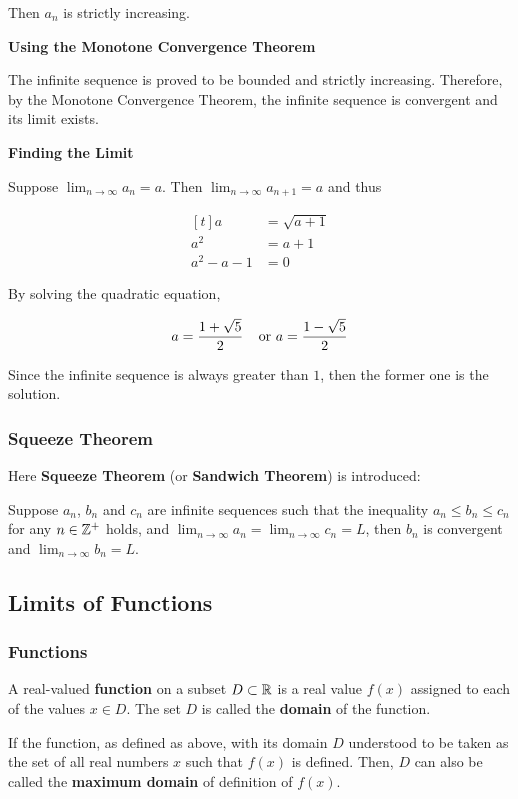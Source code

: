 \documentclass[a4paper,12pt]{article}
\begin{document}
\begin{exm}
\begin{alist}
   Then $a_{n}$ is strictly increasing.

   \item \textbf{Using the Monotone Convergence Theorem}\n

   The infinite sequence is proved to be bounded and strictly increasing. Therefore, by the Monotone Convergence Theorem, the infinite sequence is convergent and its limit exists.

   \item \textbf{Finding the Limit}\n

   Suppose $\lim_{n\to\infty}a_{n}=a$. Then $\lim_{n\to\infty}a_{n+1}=a$ and thus

   $$\begin{aligned}[t]
     a&=\sqrt{a+1}\\
     a^{2}&=a+1\\
     a^{2}-a-1&=0
   \end{aligned}$$\s

   By solving the quadratic equation,

   $$a=\frac{1+\sqrt{5}}{2}\;\;\;\;\text{or }a=\frac{1-\sqrt{5}}{2}$$\s

   Since the infinite sequence is always greater than $1$, then the former one is the solution.
   \end{alist}
\end{exm}

\subsubsection{Squeeze Theorem}
Here \textbf{Squeeze Theorem} (or \textbf{Sandwich Theorem}) is introduced:\n

\begin{thm}
  Suppose $a_{n}$, $b_{n}$ and $c_{n}$ are infinite sequences such that the inequality $a_{n}\leq b_{n}\leq c_{n}$ for any $n\in\mathbb{Z}^{+}$ holds, and $\lim_{n\to\infty}a_{n}=\lim_{n\to\infty}c_{n}=L$, then $b_{n}$ is convergent and $\lim_{n\to\infty}b_{n}=L$.
\end{thm}

\subsection{Limits of Functions}
\subsubsection{Functions}
\begin{dft}
  A real-valued \textbf{function} on a subset $D\subset \mathbb{R}$ is a real value $f(x)$ assigned to each of the values $x\in D$. The set $D$ is called the \textbf{domain} of the function.\n

  If the function, as defined as above, with its domain $D$ understood to be taken as the set of all real numbers $x$ such that $f(x)$ is defined. Then, $D$ can also be called the \textbf{maximum domain} of definition of $f(x)$.
\end{dft}
\end{document}
